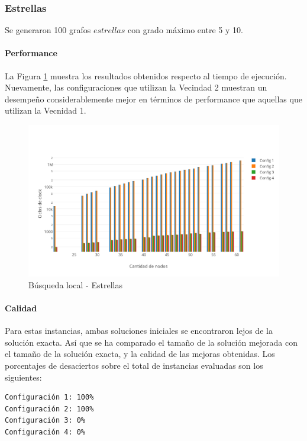 \subsubsection{Estrellas}

Se generaron 100 grafos $estrellas$ con grado máximo entre 5 y 10.

\paragraph{Performance}

La Figura \ref{fig:3B} muestra los resultados obtenidos respecto al tiempo de ejecución. Nuevamente, las configuraciones que utilizan la Vecindad 2 muestran un desempeño considerablemente mejor en términos de performance que aquellas que utilizan la Vecnidad 1.

\begin{figure}[htb]
	\begin{center}
    		\includegraphics[scale=0.8]{imagenes/busqlocal-estrellas-tiempo.png}
	\end{center}
	\caption{Búsqueda local - Estrellas}\label{fig:3B}
\end{figure}

\paragraph{Calidad} Para estas instancias, ambas soluciones iniciales se encontraron lejos de la solución exacta. Así que se ha comparado el tamaño de la solución mejorada con el tamaño de la solución exacta, y la calidad de las mejoras obtenidas.  Los porcentajes de desaciertos sobre el total de instancias evaluadas son los siguientes:

\begin{verbatim}
Configuración 1: 100%
Configuración 2: 100%
Configuración 3: 0%
Configuración 4: 0%
\end{verbatim}

